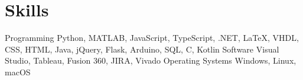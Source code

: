 \section{Skills}

\skills
  {Programming}
  {Python, MATLAB, JavaScript, TypeScript, .NET, LaTeX, VHDL, CSS, HTML, Java, jQuery, Flask, Arduino, SQL, C, Kotlin}
  {Software}
  {Visual Studio, Tableau, Fusion 360, JIRA, Vivado}
  {Operating Systems}
  {Windows, Linux, macOS}


